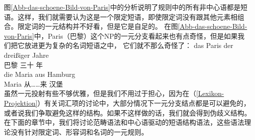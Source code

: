 图\ref{Abb-das-schoene-Bild-von-Paris}中的分析说明了规则中的所有非中心语都是短语。这样，我们就需要认为这是一个限定短语，即使限定词没有跟其他元素相组合。限定词的一元结构并不好看，但是它是自足的。
在图\ref{Abb-das-schoene-Bild-von-Paris}中，Paris（巴黎）这个NP的一元分支看起来也有点奇怪，但是如果我们把它放进更为复杂的名词短语之中， 它们就不那么奇怪了：
\eal
\ex 
\gll das Paris der dreißiger Jahre\\
	  巴黎  三十 年\\
\ex 
\gll die Maria aus Hamburg\\
	  Maria 从……来 汉堡\\
\zl
虽然一元投射有些不够优雅，但是我们不用过于担心，因为在（\ref{Lexikon-Projektion}）有关词汇项的讨论中，大部分情况下一元分支结点都是可以避免的，或者说我们争取避免这样的结构。如果不这样做的话，我们就会得到伪歧义结构。在下面的章节中，我们将讨论范畴语法和中心语驱动的短语结构语法，这些语法理论没有针对限定词、形容词和名词的一元规则。

